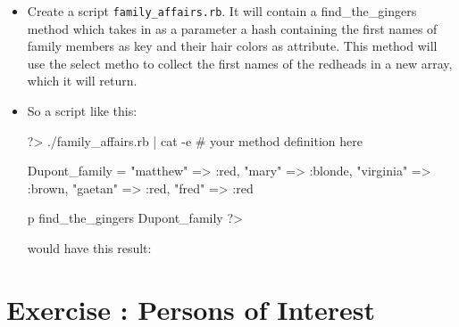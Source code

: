 \documentclass{42-en}
\begin{document}
\begin{itemize}

\item Create a script \texttt{family\_affairs.rb}. It will contain a find\_the\_gingers method which takes in as a parameter a hash containing the first names of family members as key and their hair colors as attribute. This method will use the select metho to collect the first names of the redheads in a new array, which it will return. 

\item So a script like this:
\begin{42console}
	?> ./family_affairs.rb | cat -e
	# your method definition here

	Dupont_family = {
		"matthew" => :red,
		"mary" => :blonde,
		"virginia" => :brown,
		"gaetan" => :red,
		"fred" => :red
	}

	p find_the_gingers Dupont_family
	?>
\end{42console}

would have this result:

\end{itemize}




\chapter{Exercise \exercicenumber: Persons of Interest}

\exnumber{\exercicenumber}

\makeheaderfiles
\end{document}

